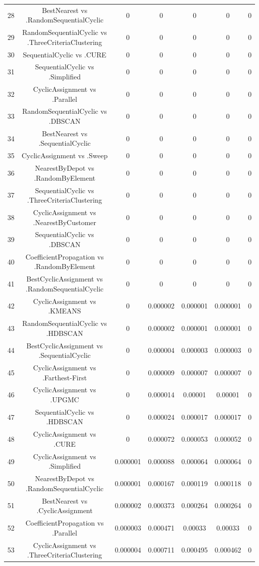 \documentclass[a4paper,10pt]{article}
\begin{document}
\begin{landscape}
\begin{table}[!htp]
\begin{tabular}{ccccccc}
28&BestNearest vs .RandomSequentialCyclic&0&0&0&0&0\\
29&RandomSequentialCyclic vs .ThreeCriteriaClustering&0&0&0&0&0\\
30&SequentialCyclic vs .CURE&0&0&0&0&0\\
31&SequentialCyclic vs .Simplified&0&0&0&0&0\\
32&CyclicAssignment vs .Parallel&0&0&0&0&0\\
33&RandomSequentialCyclic vs .DBSCAN&0&0&0&0&0\\
34&BestNearest vs .SequentialCyclic&0&0&0&0&0\\
35&CyclicAssignment vs .Sweep&0&0&0&0&0\\
36&NearestByDepot vs .RandomByElement&0&0&0&0&0\\
37&SequentialCyclic vs .ThreeCriteriaClustering&0&0&0&0&0\\
38&CyclicAssignment vs .NearestByCustomer&0&0&0&0&0\\
39&SequentialCyclic vs .DBSCAN&0&0&0&0&0\\
40&CoefficientPropagation vs .RandomByElement&0&0&0&0&0\\
41&BestCyclicAssignment vs .RandomSequentialCyclic&0&0&0&0&0\\
42&CyclicAssignment vs .KMEANS&0&0.000002&0.000001&0.000001&0\\
43&RandomSequentialCyclic vs .HDBSCAN&0&0.000002&0.000001&0.000001&0\\
44&BestCyclicAssignment vs .SequentialCyclic&0&0.000004&0.000003&0.000003&0\\
45&CyclicAssignment vs .Farthest-First&0&0.000009&0.000007&0.000007&0\\
46&CyclicAssignment vs .UPGMC&0&0.000014&0.00001&0.00001&0\\
47&SequentialCyclic vs .HDBSCAN&0&0.000024&0.000017&0.000017&0\\
48&CyclicAssignment vs .CURE&0&0.000072&0.000053&0.000052&0\\
49&CyclicAssignment vs .Simplified&0.000001&0.000088&0.000064&0.000064&0\\
50&NearestByDepot vs .RandomSequentialCyclic&0.000001&0.000167&0.000119&0.000118&0\\
51&BestNearest vs .CyclicAssignment&0.000002&0.000373&0.000264&0.000264&0\\
52&CoefficientPropagation vs .Parallel&0.000003&0.000471&0.00033&0.00033&0\\
53&CyclicAssignment vs .ThreeCriteriaClustering&0.000004&0.000711&0.000495&0.000462&0\\

\end{tabular}
\end{table}
\end{landscape}
\end{document}
